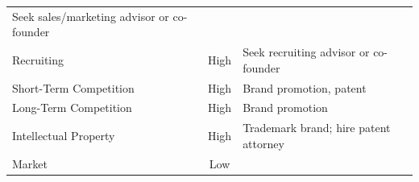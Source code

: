 \documentclass[11pt,openany]{book}
\begin{document}
\begin{longtable}[]{@{}lcl@{}}
\begin{minipage}[t]{0.49\columnwidth}
Seek sales/marketing advisor or co-founder\strut
\end{minipage}\tabularnewline
\begin{minipage}[t]{0.26\columnwidth}\raggedright
Recruiting\strut
\end{minipage} & \begin{minipage}[t]{0.16\columnwidth}\centering
High\strut
\end{minipage} & \begin{minipage}[t]{0.49\columnwidth}\raggedright
Seek recruiting advisor or co-founder\strut
\end{minipage}\tabularnewline
\begin{minipage}[t]{0.26\columnwidth}\raggedright
Short-Term Competition\strut
\end{minipage} & \begin{minipage}[t]{0.16\columnwidth}\centering
High\strut
\end{minipage} & \begin{minipage}[t]{0.49\columnwidth}\raggedright
Brand promotion, patent\strut
\end{minipage}\tabularnewline
\begin{minipage}[t]{0.26\columnwidth}\raggedright
Long-Term Competition\strut
\end{minipage} & \begin{minipage}[t]{0.16\columnwidth}\centering
High\strut
\end{minipage} & \begin{minipage}[t]{0.49\columnwidth}\raggedright
Brand promotion\strut
\end{minipage}\tabularnewline
\begin{minipage}[t]{0.26\columnwidth}\raggedright
Intellectual Property\strut
\end{minipage} & \begin{minipage}[t]{0.16\columnwidth}\centering
High\strut
\end{minipage} & \begin{minipage}[t]{0.49\columnwidth}\raggedright
Trademark brand; hire patent attorney\strut
\end{minipage}\tabularnewline
\begin{minipage}[t]{0.26\columnwidth}\raggedright
Market\strut
\end{minipage} & \begin{minipage}[t]{0.16\columnwidth}\centering
Low\strut
\end{minipage} & \begin{minipage}[t]{0.49\columnwidth}\raggedright

\end{minipage}
\end{longtable}
\end{document}

